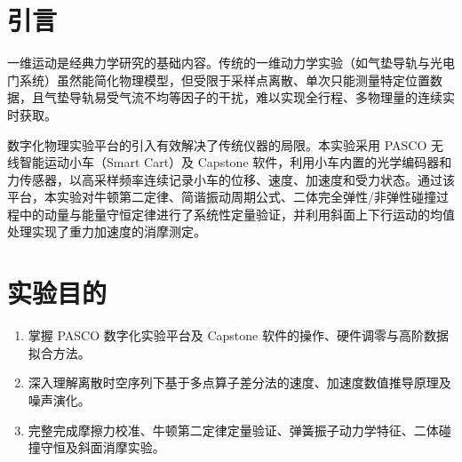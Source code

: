 \documentclass[twocolumn,zihao=5,a4paper]{ctexart} %
\begin{document}
	


\section{引言}
一维运动是经典力学研究的基础内容。传统的一维动力学实验（如气垫导轨与光电门系统）虽然能简化物理模型，但受限于采样点离散、单次只能测量特定位置数据，且气垫导轨易受气流不均等因子的干扰，难以实现全行程、多物理量的连续实时获取。

数字化物理实验平台的引入有效解决了传统仪器的局限。本实验采用 PASCO 无线智能运动小车（Smart Cart）及 Capstone 软件，利用小车内置的光学编码器和力传感器，以高采样频率连续记录小车的位移、速度、加速度和受力状态。通过该平台，本实验对牛顿第二定律、简谐振动周期公式、二体完全弹性/非弹性碰撞过程中的动量与能量守恒定律进行了系统性定量验证，并利用斜面上下行运动的均值处理实现了重力加速度的消摩测定。
	\section{实验目的}
	\begin{enumerate}
		\item 掌握 PASCO 数字化实验平台及 Capstone 软件的操作、硬件调零与高阶数据拟合方法。
		\item 深入理解离散时空序列下基于多点算子差分法的速度、加速度数值推导原理及噪声演化。
		\item 完整完成摩擦力校准、牛顿第二定律定量验证、弹簧振子动力学特征、二体碰撞守恒及斜面消摩实验。
	\end{enumerate}
	
\end{document}
